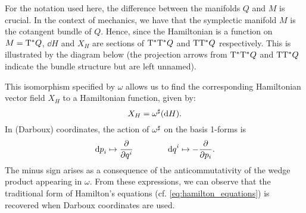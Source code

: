 For the notation used here, the difference between the manifolds \(Q\) and \(M\) is crucial. In the context of mechanics, we have that the symplectic manifold \(M\) is the cotangent bundle of \(Q\). Hence, since the Hamiltonian is a function on \(M = \mathrm{T}^*Q\), \(\dd{H}\) and \(X_H\) are sections of \(\mathrm{T}^*\mathrm{T}^*Q\) and \(\mathrm{T}\mathrm{T}^*Q\) respectively. This is illustrated by the diagram below (the projection arrows from \(\mathrm{T}^*\mathrm{T}^*Q\) and \(\mathrm{T}\mathrm{T}^*Q\) indicate the bundle structure but are left unnamed).
\begin{center}
\end{center}
This isomorphism specified by \(\omega\) allows us to find the corresponding Hamiltonian vector field \(X_H\) to a Hamiltonian function, given by:
\begin{equation} 
    X_H = \omega^\sharp(\dd{H}). 
    \label{eq:symplectic_hamiltonian_vf}
\end{equation}
In (Darboux) coordinates, the action of \( \omega^\sharp\) on the basis 1-forms is
\begin{equation}
     \dd{p}_i \mapsto \pdv{}{q^i} \qquad\qquad \dd{q}^i \mapsto -\pdv{}{p_i}.
\end{equation} 
The minus sign arises as a consequence of the anticommutativity of the wedge product appearing in \(\omega\). From these expressions, we can observe that the traditional form of Hamilton's equations (cf. \cref{eq:hamilton_equations}) is recovered when Darboux coordinates are used.

